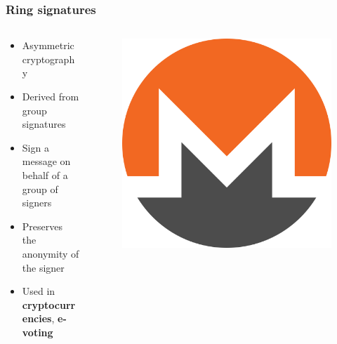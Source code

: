 \documentclass[%
  14pt,       				%
	c,                  %
	aspectratio=1610,   %
	unicode,						%
]{beamer}				    	%
\begin{document}
\begin{frame}
  \frametitle{Ring signatures}
  \large{
    \begin{columns}[T]
      \begin{column}{0.8\textwidth}
        \begin{itemize}
          \item Asymmetric cryptography
          \item Derived from group signatures
          \item Sign a message on behalf of a group of signers
          \item Preserves the anonymity of the signer
          \item Used in \textbf{cryptocurrencies}, \textbf{e-voting}
        \end{itemize}
      \end{column}
      \begin{column}{0.2\textwidth}
        \begin{figure}[htbp]
          \centering
          \includegraphics[width=\textwidth]{images/monero.png}
        \end{figure}
      \end{column}
    \end{columns}
  }
\end{frame}
\end{document}
